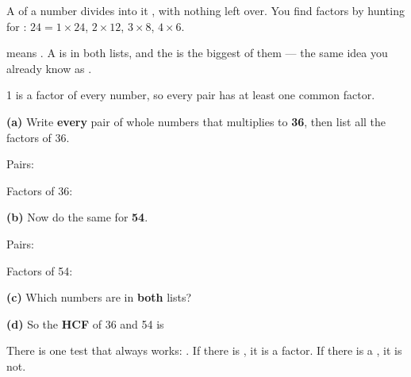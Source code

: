 \documentclass[12pt,a4paper]{article}
\begin{document}
\begin{remember}
  A  of a number divides into it , with nothing left over.
  You find factors by hunting for : $24 = 1 \times 24$, $2 \times 12$,
  $3 \times 8$, $4 \times 6$.

  \medskip
   means . A  is in both lists, and the
   is the biggest of them --- the same idea you
  already know as .

  \medskip
   1 is a factor of every number, so every pair has
  at least one common factor.
\end{remember}


\noindent\textbf{(a)} Write \textbf{every} pair of whole numbers that multiplies to
\textbf{36}, then list all the factors of 36.

\vspace{4pt}
\noindent\hspace*{1em}Pairs: \blank[12.4cm]

\vspace{6pt}
\noindent\hspace*{1em}Factors of 36: \blank[11.2cm]

\vspace{9pt}
\noindent\textbf{(b)} Now do the same for \textbf{54}.

\vspace{4pt}
\noindent\hspace*{1em}Pairs: \blank[12.4cm]

\vspace{6pt}
\noindent\hspace*{1em}Factors of 54: \blank[11.2cm]

\vspace{9pt}
\noindent\textbf{(c)} Which numbers are in \textbf{both} lists? \blank[9.4cm]

\vspace{8pt}
\noindent\textbf{(d)} So the \textbf{HCF} of 36 and 54 is \blank[3cm]


\begin{remember}
  There is one test that always works: . If there is
  , it is a factor. If there is a , it is not.
\end{remember}
\end{document}
